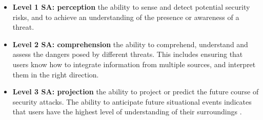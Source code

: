 \begin{itemize}
    \item \textbf{Level 1 SA: perception} the ability to sense and detect potential security risks, and to achieve an understanding of the presence or awareness of a threat.
    \item \textbf{Level 2 SA: comprehension} the ability to comprehend, understand and assess the dangers posed by different threats. This includes ensuring that users know how to integrate information from multiple sources, and interpret them in the right direction. 
    \item \textbf{Level 3 SA: projection} the ability to project or predict the future course of security attacks. The ability to anticipate future situational events indicates that users have the highest level of understanding of their surroundings \cite{SHAW200992}. 
\end{itemize}

